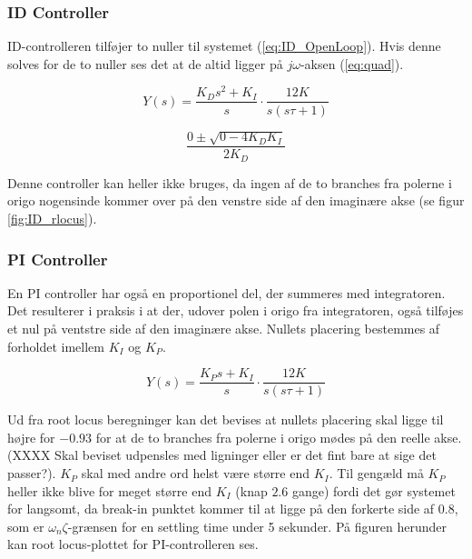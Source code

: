 \subsubsection{ID Controller}

ID-controlleren tilføjer to nuller til systemet (\ref{eq:ID_OpenLoop}). Hvis denne solves for de to nuller ses det at de altid ligger på $j\omega$-aksen (\ref{eq:quad}).

\begin{equation}\label{eq:ID_OpenLoop}
Y(s)=\frac{K_{D}s^2+K_{I}}{s}\cdot\frac{12K}{s(s\tau+1)}
\end{equation}

\begin{equation}\label{eq:quad}
\dfrac{0\pm\sqrt{0-4K_{D}K_{I}}}{2K_{D}}
\end{equation}

Denne controller kan heller ikke bruges, da ingen af de to branches fra polerne i origo nogensinde kommer over på den venstre side af den imaginære akse (se figur \ref{fig:ID_rlocus}).

\subsubsection{PI Controller}

En PI controller har også en proportionel del, der summeres med integratoren. Det resulterer i praksis i at der, udover polen i origo fra integratoren, også tilføjes et nul på ventstre side af den imaginære akse. Nullets placering bestemmes af forholdet imellem $K_{I}$ og $K_{P}$.

\begin{equation}\label{eq:PI_OpenLoop}
Y(s)=\frac{K_{P}s+K_{I}}{s}\cdot\frac{12K}{s(s\tau+1)}
\end{equation}

Ud fra root locus beregninger kan det bevises at nullets placering skal ligge til højre for $-0.93$ for at de to branches fra polerne i origo mødes på den reelle akse. (XXXX Skal beviset udpensles med ligninger eller er det fint bare at sige det passer?). $K_{P}$ skal med andre ord helst være større end $K_{I}$. Til gengæld må $K_{P}$ heller ikke blive for meget større end $K_{I}$ (knap $2.6$ gange) fordi det gør systemet for langsomt, da break-in punktet kommer til at ligge på den forkerte side af $0.8$, som er $\omega_{n}\zeta$-grænsen for en settling time under 5 sekunder. På figuren herunder kan root locus-plottet for PI-controlleren ses.

